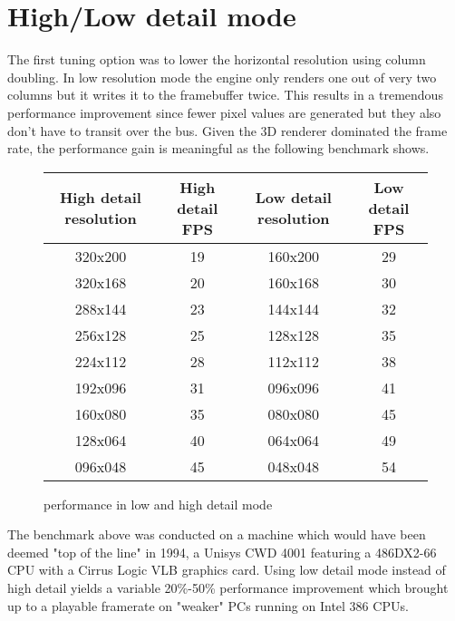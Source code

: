 \section{High/Low detail mode}
The first tuning option was to lower the horizontal resolution using column doubling. In low resolution mode the engine only renders one out of very two columns but it writes it to the framebuffer twice. This results in a tremendous performance improvement since fewer pixel values are generated but they also don't have to transit over the bus. Given the 3D renderer dominated the frame rate, the performance gain is meaningful as the following benchmark shows.\\
\par
 \vspace{0.5cm}
\begin{figure}[H]
\centering  
\begin{tabularx}{\textwidth}{ C{1} C{1} C{1} C{1} } 
  \toprule
  \textbf{High detail resolution} & \textbf{High detail FPS} &  \textbf{Low detail resolution}  & \textbf{Low detail FPS}\\
  \toprule 
320x200  &  19   & 160x200  &       29 \\
320x168  &  20   & 160x168  &       30 \\
288x144  &  23   & 144x144  &       32 \\
256x128  &  25   & 128x128  &       35 \\
224x112  &  28   & 112x112  &       38 \\
192x096  &  31   & 096x096  &       41 \\
160x080  &  35   & 080x080  &       45 \\
128x064  &  40   & 064x064  &       49 \\
096x048  &  45   & 048x048  &       54 \\
  \toprule
\end{tabularx}
\caption{\doom{} performance in low and high detail mode}
\end{figure}
The benchmark above was conducted on a machine which would have been deemed "top of the line" in 1994, a Unisys CWD 4001 featuring a 486DX2-66 CPU with a Cirrus Logic VLB graphics card. Using low detail mode instead of high detail yields a variable 20\%-50\% performance improvement which brought up \doom{} to a playable framerate on "weaker" PCs running on Intel 386 CPUs.


